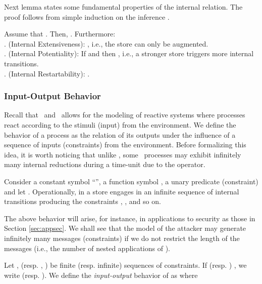 \documentclass{tlp}
\begin{document}
Next lemma states some fundamental properties of the internal relation. The proof  follows from simple induction on the inference . 
\begin{lemma}[Properties of ]\label{lemma:redi-properties}
Assume that . Then, . Furthermore: 
\\. (Internal Extensiveness): , i.e.,  the store can only be augmented. 
\\. (Internal Potentiality): If  and     then , i.e.,   a stronger store triggers more internal transitions. 
\\. (Internal Restartability): .
\end{lemma}
\subsubsection{Input-Output Behavior}
Recall that \tccp\ and \utcc\  allows for the modeling of reactive systems where processes react according to the stimuli (input) from the environment. We  define the behavior of a process  as the relation of its outputs under the influence of a sequence of inputs (constraints) from the environment. Before  formalizing this idea, it is worth noticing that unlike \tccp, some \utcc\ 
processes may exhibit infinitely many internal reductions during a time-unit due to the  operator. 

\begin{example}\label{ex:inf-behav}
Consider a constant symbol ``'', a function symbol , a unary predicate (constraint)  and let . Operationally,   in a store    engages in an infinite sequence of internal transitions producing the constraints  , ,  and so on. 
\end{example}
The above behavior will arise, for instance,  in applications to security as those in Section \ref{sec:appsec}. We shall see that  the model of the attacker may generate infinitely many messages (constraints) if we do not restrict the length  of the messages (i.e., the number of nested applications of  ). 





\begin{definition} \label{def:behavior}
Let ,   
(resp. , )
be finite (resp. infinite) sequences of
constraints. If   
(resp.  )
, we  write  (resp. ). We define the 
\emph{input-output} behavior of  as  where

\end{definition}
\end{document}
